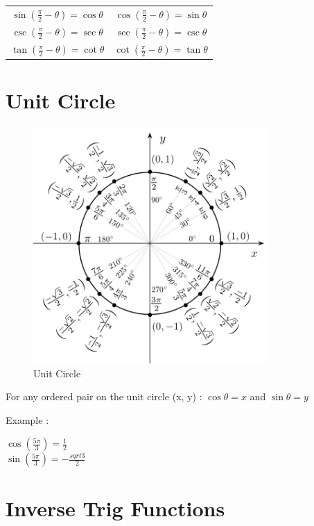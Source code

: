 \documentclass[10pt,onecolumn]{article}
\begin{document}
{\begin{tabular}{c|c}
\(\sin(\frac{\pi}{2} - \theta) = \cos \theta\) & \(\cos(\frac{\pi}{2} - \theta) = \sin \theta\)\\
\(\csc(\frac{\pi}{2} - \theta) = \sec \theta\) & \(\sec(\frac{\pi}{2} - \theta) = \csc \theta\)\\
\(\tan(\frac{\pi}{2} - \theta) = \cot \theta\) & \(\cot(\frac{\pi}{2} - \theta) = \tan \theta\) \\
\end{tabular}

\pagebreak

\part{Unit Circle}

\begin{figure}[Unit Circle]
\centering
\includegraphics[width=90mm]{unit_circle.png}
\caption{Unit Circle}
\label{overflow}
\end{figure}

For any ordered pair on the unit circle (x, y) : \(\cos \theta = x\) and \(\sin \theta = y\)

Example :

\(\cos(\frac{5\pi}{3}) = \frac{1}{2}\) \\
\(\sin(\frac{5\pi}{3}) = -\frac{sqrt{3}}{2}\) \\
\pagebreak

\part{Inverse Trig Functions}

}
\end{document}
